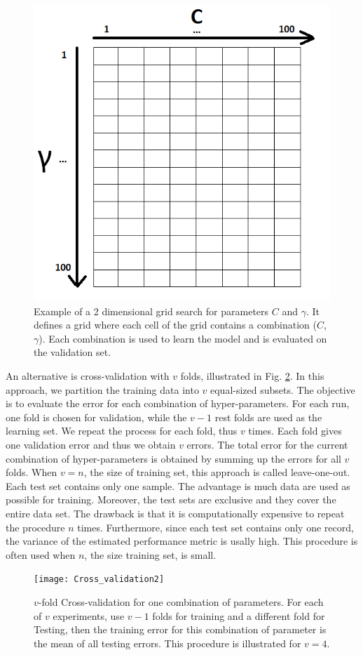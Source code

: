 \begin{figure}[h!]
\centering
\includegraphics[width=0.4\linewidth]{images/GridSearch}
\caption{Example of a 2 dimensional grid search for parameters $C$ and $\gamma$. It defines a grid where each cell of the grid contains a combination ($C$, $\gamma$). Each combination is used to learn the model and is evaluated on the validation set.}
\label{fig:GridSearch}
\end{figure}

An alternative is cross-validation with $v$ folds, illustrated in Fig. \ref{fig:Cross_validation}. In this approach, we partition the training data into $v$ equal-sized subsets. The objective is to evaluate the error for each combination of hyper-parameters. For each run, one fold is chosen for validation, while the $v-1$ rest folds are used as the learning set. We repeat the process for each fold, thus $v$ times. Each fold gives one validation error and thus we obtain $v$ errors. The total error for the current combination of hyper-parameters is obtained by summing up the errors for all $v$ folds. When $v=n$, the size of training set, this approach is called leave-one-out. Each test set contains only one sample. The advantage is much data are used as possible for training. Moreover, the test sets are exclusive and they cover the entire data set. The drawback is that it is computationally expensive to repeat the procedure $n$ times. Furthermore, since each test set contains only one record, the variance of the estimated performance metric is usally high. This procedure is often used when $n$, the size training set, is small.

\begin{figure}[h!]
	\centering
	\texttt{[image: Cross\_validation2]}
	\caption{$v$-fold Cross-validation for one combination of parameters. For each of $v$ experiments, use $v-1$ folds for training and a different fold for Testing, then the training error for this combination of parameter is the mean of all testing errors. This procedure is illustrated for $v=4$.}
	\label{fig:Cross_validation}
\end{figure}

